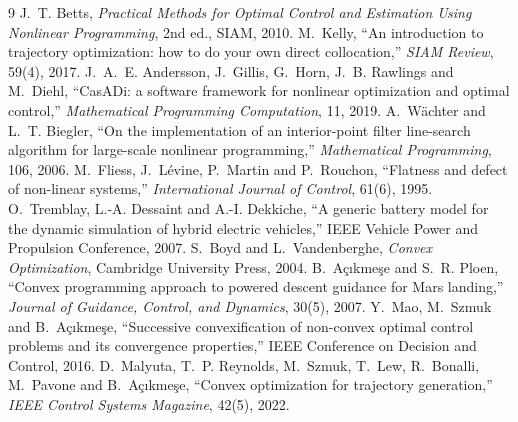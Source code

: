 \documentclass[11pt,a4paper]{article}
\begin{document}
\begin{thebibliography}{9}
 J.~T. Betts, \emph{Practical Methods for Optimal Control and Estimation Using Nonlinear Programming}, 2nd ed., SIAM, 2010.
 M.~Kelly, ``An introduction to trajectory optimization: how to do your own direct collocation,'' \emph{SIAM Review}, 59(4), 2017.
 J.~A.~E. Andersson, J.~Gillis, G.~Horn, J.~B. Rawlings and M.~Diehl, ``CasADi: a software framework for nonlinear optimization and optimal control,'' \emph{Mathematical Programming Computation}, 11, 2019.
 A.~Wächter and L.~T. Biegler, ``On the implementation of an interior-point filter line-search algorithm for large-scale nonlinear programming,'' \emph{Mathematical Programming}, 106, 2006.
 M.~Fliess, J.~Lévine, P.~Martin and P.~Rouchon, ``Flatness and defect of non-linear systems,'' \emph{International Journal of Control}, 61(6), 1995.
 O.~Tremblay, L.-A. Dessaint and A.-I. Dekkiche, ``A generic battery model for the dynamic simulation of hybrid electric vehicles,'' IEEE Vehicle Power and Propulsion Conference, 2007.
 S.~Boyd and L.~Vandenberghe, \emph{Convex Optimization}, Cambridge University Press, 2004.
 B.~Açıkmeşe and S.~R. Ploen, ``Convex programming approach to powered descent guidance for Mars landing,'' \emph{Journal of Guidance, Control, and Dynamics}, 30(5), 2007.
 Y.~Mao, M.~Szmuk and B.~Açıkmeşe, ``Successive convexification of non-convex optimal control problems and its convergence properties,'' IEEE Conference on Decision and Control, 2016.
 D.~Malyuta, T.~P. Reynolds, M.~Szmuk, T.~Lew, R.~Bonalli, M.~Pavone and B.~Açıkmeşe, ``Convex optimization for trajectory generation,'' \emph{IEEE Control Systems Magazine}, 42(5), 2022.
\end{thebibliography}
\end{document}
